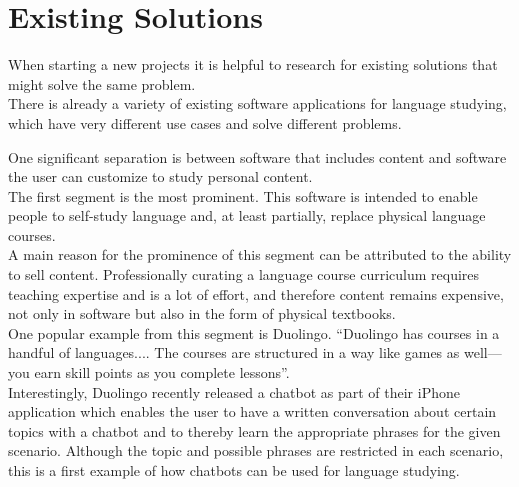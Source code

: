 \section{Existing Solutions}
\label{existing}

When starting a new projects it is helpful to research for existing solutions that might solve the same problem.
\\
There is already a variety of existing software applications for language studying, which have very different use cases and solve different problems.

One significant separation is between software that includes content and software the user can customize to study personal content.
\\

The first segment is the most prominent. This software is intended to enable people to self-study language and, at least partially, replace physical language courses.
\\
A main reason for the prominence of this segment can be attributed to the ability to sell content.
Professionally curating a language course curriculum requires teaching expertise and is a lot of effort, and therefore content remains expensive, not only in software but also in the form of physical textbooks.
\\
One popular example from this segment is Duolingo. ``Duolingo has courses in a handful of languages.... The courses are structured in a way like games as well—you earn skill points as you complete lessons''\cite{lifehacker}.
\\
Interestingly, Duolingo recently released a chatbot\cite{topbots2} as part of their iPhone application which enables the user to have a written conversation about certain topics with a chatbot and to thereby learn the appropriate phrases for the given scenario. Although the topic and possible phrases are restricted in each scenario, this is a first example of how chatbots can be used for language studying.



